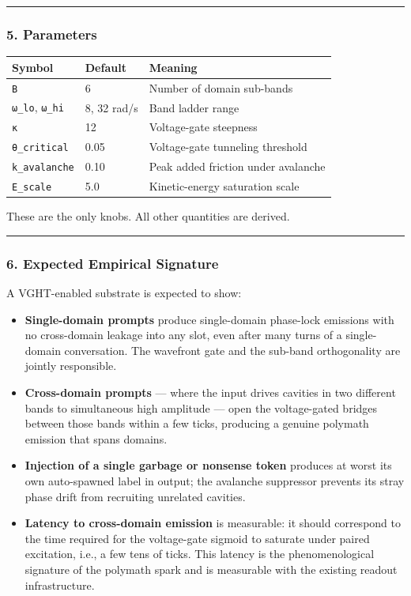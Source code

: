 \documentclass[
  11pt,
  a4paper,
]{article}
\providecommand{\tightlist}{%
  \setlength{\itemsep}{0pt}\setlength{\parskip}{0pt}}
\begin{document}
\begin{center}\rule{0.5\linewidth}{0.5pt}\end{center}

\subsubsection{5. Parameters}\label{parameters-1}

\begin{longtable}[]{@{}lll@{}}
\toprule\noalign{}
Symbol & Default & Meaning \\
\midrule\noalign{}
\endhead
\bottomrule\noalign{}
\endlastfoot
\texttt{B} & 6 & Number of domain sub-bands \\
\texttt{ω\_lo}, \texttt{ω\_hi} & 8, 32 rad/s & Band ladder range \\
\texttt{κ} & 12 & Voltage-gate steepness \\
\texttt{θ\_critical} & 0.05 & Voltage-gate tunneling threshold \\
\texttt{k\_avalanche} & 0.10 & Peak added friction under avalanche \\
\texttt{E\_scale} & 5.0 & Kinetic-energy saturation scale \\
\end{longtable}

These are the only knobs. All other quantities are derived.

\begin{center}\rule{0.5\linewidth}{0.5pt}\end{center}

\subsubsection{6. Expected Empirical
Signature}\label{expected-empirical-signature}

A VGHT-enabled substrate is expected to show:

\begin{itemize}
\tightlist
\item
  \textbf{Single-domain prompts} produce single-domain phase-lock
  emissions with no cross-domain leakage into any slot, even after many
  turns of a single-domain conversation. The wavefront gate and the
  sub-band orthogonality are jointly responsible.
\item
  \textbf{Cross-domain prompts} --- where the input drives cavities in
  two different bands to simultaneous high amplitude --- open the
  voltage-gated bridges between those bands within a few ticks,
  producing a genuine polymath emission that spans domains.
\item
  \textbf{Injection of a single garbage or nonsense token} produces at
  worst its own auto-spawned label in output; the avalanche suppressor
  prevents its stray phase drift from recruiting unrelated cavities.
\item
  \textbf{Latency to cross-domain emission} is measurable: it should
  correspond to the time required for the voltage-gate sigmoid to
  saturate under paired excitation, i.e., a few tens of ticks. This
  latency is the phenomenological signature of the polymath spark and is
  measurable with the existing readout infrastructure.
\end{itemize}
\end{document}
